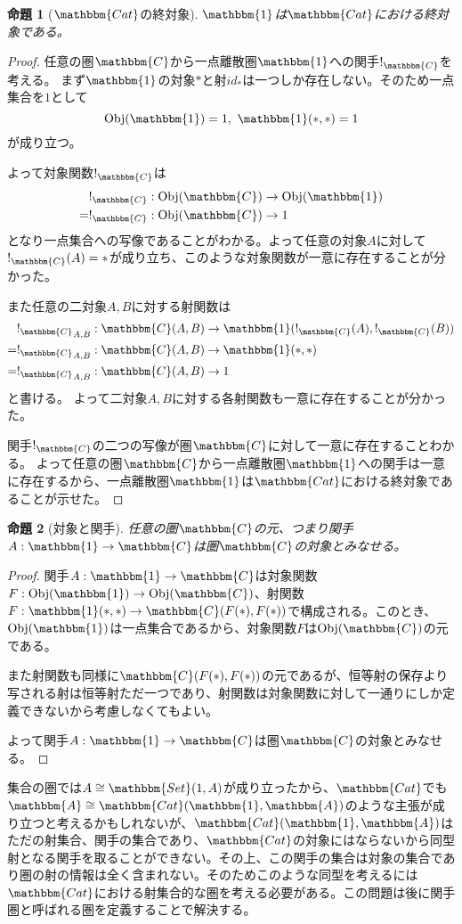 \documentclass[uplatex,dvipdfmx]{jsarticle}
\newcommand{\cat}[1]{\mathbbm{#1}}
\newcommand{\arrow}{\rightarrow}
\newcommand{\functor}[3]{#1:\cat{#2}\arrow \cat{#3}}
\newcommand{\obj}[1]{\mathrm{Obj}(\cat{#1})}
\newcommand{\mor}[3]{#1:#2\arrow #3}
\newcommand{\arset}[3]{\cat{#1}(#2,#3)}
\newtheorem{proof}{証明}[section]
\newtheorem{prop}{命題}[section]
\numberwithin{proof}{subsection}
\numberwithin{prop}{subsection}
\numberwithin{define}{subsection}
\begin{document}
	\begin{prop}[$\cat{Cat}$の終対象]
		$\cat{1}$は$\cat{Cat}$における終対象である。
	\end{prop}
	\begin{proof}
		任意の圏$\cat{C}$から一点離散圏$\cat{1}$への関手$!_{\cat{C}}$を考える。
		まず$\cat{1}$の対象$*$と射$id_*$は一つしか存在しない。そのため一点集合を$1$として
		\[\obj{1}=1,\ \arset{1}{*}{*}=1\]が成り立つ。

		よって対象関数$!_{\cat{C}}$は
		\begin{align*}
			&\mor{!_{\cat{C}}}{\obj{C}}{\obj{1}}\\
			=&\mor{!_{\cat{C}}}{\obj{C}}{1}
		\end{align*}
		となり一点集合への写像であることがわかる。よって任意の対象$A$に対して$!_{\cat{C}}(A)=*$が成り立ち、このような対象関数が一意に存在することが分かった。

		また任意の二対象$A,B$に対する射関数は
		\begin{align*}
			&\mor{{!_{\cat{C}}}_{A,B}}{\arset{C}{A}{B}}{\arset{1}{!_{\cat{C}}(A)}{!_{\cat{C}}(B)}}\\
			=&\mor{{!_{\cat{C}}}_{A,B}}{\arset{C}{A}{B}}{\arset{1}{*}{*}}\\
			=&\mor{{!_{\cat{C}}}_{A,B}}{\arset{C}{A}{B}}{1}\\
		\end{align*}と書ける。
		よって二対象$A,B$に対する各射関数も一意に存在することが分かった。

		関手$!_{\cat{C}}$の二つの写像が圏$\cat{C}$に対して一意に存在することわかる。
		よって任意の圏$\cat{C}$から一点離散圏$\cat{1}$への関手は一意に存在するから、一点離散圏$\cat{1}$は$\cat{Cat}$における終対象であることが示せた。
	\end{proof}
	\begin{prop}[対象と関手]
		任意の圏$\cat{C}$の元、つまり関手$\functor{A}{1}{C}$は圏$\cat{C}$の対象とみなせる。
	\end{prop}
	\begin{proof}
		関手$\functor{A}{1}{C}$は対象関数$\mor{F}{\obj{1}}{\obj{C}}$、射関数$\mor{F}{\arset{1}{*}{*}}{\arset{C}{F(*)}{F(*)}}$で構成される。このとき、$\obj{1}$は一点集合であるから、対象関数$F$は$\obj{C}$の元である。

		また射関数も同様に$\arset{C}{F(*)}{F(*)}$の元であるが、恒等射の保存より写される射は恒等射ただ一つであり、射関数は対象関数に対して一通りにしか定義できないから考慮しなくてもよい。

		よって関手$\functor{A}{1}{C}$は圏$\cat{C}$の対象とみなせる。
	\end{proof}
  集合の圏では$A\cong\arset{Set}{1}{A}$が成り立ったから、$\cat{Cat}$でも$\cat{A}\cong\arset{Cat}{\cat{1}}{\cat{A}}$のような主張が成り立つと考えるかもしれないが、$\arset{Cat}{\cat{1}}{\cat{A}}$はただの射集合、関手の集合であり、$\cat{Cat}$の対象にはならないから同型射となる関手を取ることができない。その上、この関手の集合は対象の集合であり圏の射の情報は全く含まれない。そのためこのような同型を考えるには$\cat{Cat}$における射集合的な圏を考える必要がある。この問題は後に関手圏と呼ばれる圏を定義することで解決する。
\end{document}
